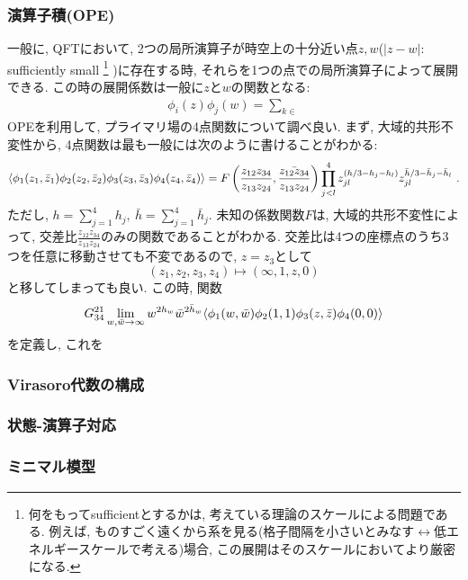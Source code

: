\subsubsection{演算子積(OPE)}
一般に, QFTにおいて, 2つの局所演算子が時空上の十分近い点$z, w$($|z-w|$: sufficiently small
\footnote{何をもってsufficientとするかは, 考えている理論のスケールによる問題である. 
例えば, ものすごく遠くから系を見る(格子間隔を小さいとみなす$\leftrightarrow$低エネルギースケールで考える)場合, 
この展開はそのスケールにおいてより厳密になる. }
)に存在する時, それらを1つの点での局所演算子によって展開できる. 
この時の展開係数は一般に$z$と$w$の関数となる: 
\begin{align}
    \phi_i(z) \phi_j(w)=\sum_{k\in }
\end{align}
OPEを利用して, プライマリ場の4点関数について調べ良い. 
まず, 大域的共形不変性から, 4点関数は最も一般には次のように書けることがわかる: 
\begin{align}
    \langle{\phi_1(z_1, \bar{z}_1)\phi_2(z_2, \bar{z}_2)\phi_3(z_3, \bar{z}_3)\phi_4(z_4, \bar{z}_4)}\rangle
    =F\left({\frac{z_{12}z_{34}}{z_{13}z_{24}}, \bar{\frac{z_{12}z_{34}}{z_{13}z_{24}}}}\right)
    \prod_{j<l}^{4}z_{jl}^{(h/3 - h_j - h_l)}z_{jl}^{\bar{h}/3 - \bar{h}_j - \bar{h}_l}~. 
\end{align}
ただし, $h=\sum_{j=1}^4h_j, ~ \bar{h}=\sum_{j=1}^4 \bar{h}_j$. 
未知の係数関数$F$は, 大域的共形不変性によって, 交差比$\frac{z_{12}z_{34}}{z_{13}z_{24}}$のみの関数であることがわかる. 
交差比は4つの座標点のうち3つを任意に移動させても不変であるので, $z=z_3$として
$$(z_1, z_2, z_3, z_4)\mapsto (\infty, 1, z, 0)$$
と移してしまっても良い. この時, 関数
\begin{align}
    G^{21}_{34}\lim_{w, \bar{w}\to \infty}w^{2h_w}\bar{w}^{2\bar{h}_w}\langle{\phi_1(w, \bar{w})\phi_2(1, 1)\phi_3(z, \bar{z})\phi_4(0,0)}\rangle
\end{align}
を定義し, これを
\subsubsection{Virasoro代数の構成}
\subsubsection{状態-演算子対応}
\subsubsection{ミニマル模型}

